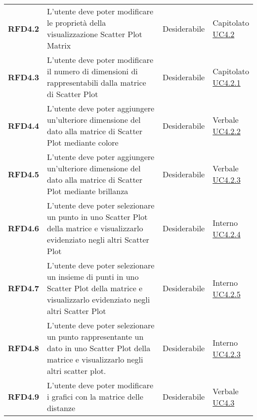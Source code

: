 \begin{longtable}[H]{>{\raggedright\bfseries}m{20mm} >{\raggedright}m{90mm} >{\raggedright}m{28mm} >{\raggedright\arraybackslash}m{30mm}}
    RFD4.2
    & L'utente deve poter modificare le proprietà della visualizzazione Scatter Plot Matrix
    & Desiderabile
    & \makecell{ Capitolato \\ \hyperref[ssub:uc4.2]{UC4.2} }\\

    RFD4.3
    & L'utente deve poter modificare il numero di dimensioni di rappresentabili dalla matrice di Scatter Plot
    & Desiderabile
    & \makecell{ Capitolato \\ \hyperref[par:uc4.2.1]{UC4.2.1} }\\

    RFD4.4
    & L'utente deve poter aggiungere un'ulteriore dimensione del dato alla matrice di Scatter Plot mediante colore
    & Desiderabile
    & \makecell{ Verbale \\ \hyperref[par:uc4.2.2]{UC4.2.2} }\\

    RFD4.5
    & L'utente deve poter aggiungere un'ulteriore dimensione del dato alla matrice di Scatter Plot mediante brillanza
    & Desiderabile
    & \makecell{ Verbale \\ \hyperref[par:uc4.2.3]{UC4.2.3} }\\

    RFD4.6
    & L'utente deve poter selezionare un punto in uno Scatter Plot della matrice e visualizzarlo evidenziato negli 
    altri Scatter Plot
    & Desiderabile
    & \makecell{ Interno \\ \hyperref[par:uc4.2.4]{UC4.2.4} }\\

    RFD4.7
    & L'utente deve poter selezionare un insieme di punti in uno Scatter Plot della matrice e visualizzarlo evidenziato 
    negli altri Scatter Plot
    & Desiderabile
    & \makecell{ Interno \\ \hyperref[par:uc4.2.5]{UC4.2.5} }\\

    RFD4.8
    & L'utente deve poter selezionare un punto rappresentante un dato in uno Scatter Plot della matrice e visualizzarlo 
    negli altri scatter plot.
    & Desiderabile
    & \makecell{ Interno \\ \hyperref[par:uc4.2.3]{UC4.2.3} }\\

    RFD4.9
    & L'utente deve poter modificare i grafici con la matrice delle distanze
    & Desiderabile
    & \makecell{ Verbale \\ \hyperref[ssub:uc4.3]{UC4.3} }\\


\end{longtable}
